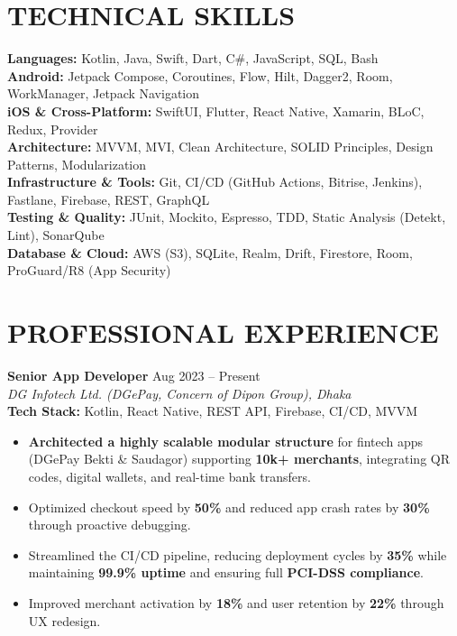 \documentclass[10pt,a4paper]{article}
\begin{document}
\section*{TECHNICAL SKILLS}
\textbf{Languages:} Kotlin, Java, Swift, Dart, C\#, JavaScript, SQL, Bash \\
\textbf{Android:} Jetpack Compose, Coroutines, Flow, Hilt, Dagger2, Room, WorkManager, Jetpack Navigation \\
\textbf{iOS \& Cross-Platform:} SwiftUI, Flutter, React Native, Xamarin, BLoC, Redux, Provider \\
\textbf{Architecture:} MVVM, MVI, Clean Architecture, SOLID Principles, Design Patterns, Modularization \\
\textbf{Infrastructure \& Tools:} Git, CI/CD (GitHub Actions, Bitrise, Jenkins), Fastlane, Firebase, REST, GraphQL \\
\textbf{Testing \& Quality:} JUnit, Mockito, Espresso, TDD, Static Analysis (Detekt, Lint), SonarQube \\
\textbf{Database \& Cloud:} AWS (S3), SQLite, Realm, Drift, Firestore, Room, ProGuard/R8 (App Security)

\vspace{4pt}

\section*{PROFESSIONAL EXPERIENCE}

\textbf{Senior App Developer} \hfill Aug 2023 -- Present \\
\textit{DG Infotech Ltd. (DGePay, Concern of Dipon Group), Dhaka} \\
\textbf{Tech Stack:} Kotlin, React Native, REST API, Firebase, CI/CD, MVVM
\begin{itemize}
\item \textbf{Architected a highly scalable modular structure} for fintech apps (DGePay Bekti \& Saudagor) supporting \textbf{10k+ merchants}, integrating QR codes, digital wallets, and real-time bank transfers.    
\item Optimized checkout speed by \textbf{50\%} and reduced app crash rates by \textbf{30\%} through proactive debugging.
\item Streamlined the CI/CD pipeline, reducing deployment cycles by \textbf{35\%} while maintaining \textbf{99.9\% uptime} and ensuring full \textbf{PCI-DSS compliance}.    
\item Improved merchant activation by \textbf{18\%} and user retention by \textbf{22\%} through UX redesign.
\end{itemize}
\end{document}
